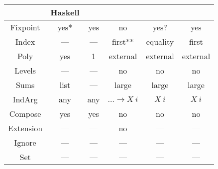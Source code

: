 \documentclass[10pt]{article}
\theoremstyle{plain}
\theoremstyle{definition}
\begin{document}
\begin{tabular}{c | c c c c c}
             & Haskell        & \cite{initenough} & \cite{levitation} & \cite{algorn} & \cite{progorn} \\
    \hline                                                                                             
    Fixpoint & yes*           & yes               & no                & yes?          & yes            \\
    Index    & —              & —                 & first**           & equality      & first          \\
    Poly     & yes            & 1                 & external          & external      & external       \\
    Levels   & —              & —                 & no                & no            & no             \\
    Sums     & list           & —                 & large             & large         & large          \\
    IndArg   & any            & any               & $\dots \to X\ i$  & $X\ i$        & $X\ i$         \\
    Compose  & yes            & yes               & no                & no            & no             \\
    Extension& —              & —                 & no                & —             & —              \\
    Ignore   & —              & —                 & —                 & —             & —              \\
    Set      & —              & —                 & —                 & —             & —              \\
\end{tabular}
\end{document}
